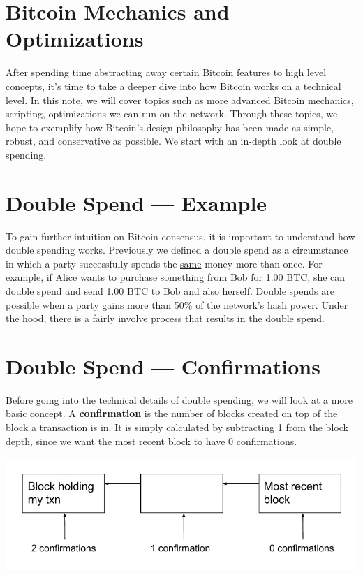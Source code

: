 \documentclass[11pt]{article}
\begin{document}
    \thispagestyle{firstpage}
    \vspace*{2\baselineskip}
    
    
    \section*{Bitcoin Mechanics and Optimizations}
    
    After spending time abstracting away certain Bitcoin features to high level concepts, it's time to take a deeper dive into how Bitcoin works on a technical level. In this note, we will cover topics such as more advanced Bitcoin mechanics, scripting, optimizations we can run on the network. Through these topics, we hope to exemplify how Bitcoin's design philosophy has been made as simple, robust, and conservative as possible. We start with an in-depth look at double spending.
    
     \section*{Double Spend --- Example}
 
     To gain further intuition on Bitcoin consensus, it is important to understand how double spending works. Previously we defined a double spend as a circumstance in which a party successfully spends the \underline{same} money more than once. For example, if Alice wants to purchase something from Bob for 1.00 BTC, she can double spend and send 1.00 BTC to Bob and also herself. Double spends are possible when a party gains more than 50\% of the network's hash power. Under the hood, there is a fairly involve process that results in the double spend.
     
     \section*{Double Spend --- Confirmations}
     
     Before going into the technical details of double spending, we will look at a more basic concept. A \textbf{confirmation} is the number of blocks created on top of the block a transaction is in. It is simply calculated by subtracting 1 from the block depth, since we want the most recent block to have 0 confirmations. 
 
  \includegraphics[scale=0.5]{confirmations} \\
  
\end{document}
